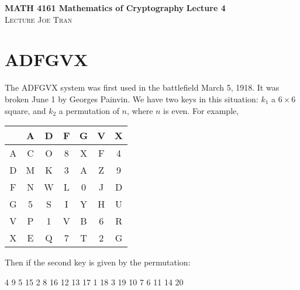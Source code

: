 \documentclass[11pt]{article}
\theoremstyle{definition}\newtheorem{definition}{Definition}
\theoremstyle{definition}\newtheorem{example}{Example}
\theoremstyle{definition}\newtheorem{samplecode}{Sample Code}
\begin{document}
\noindent \textbf{MATH 4161 Mathematics of Cryptography} \hfill \textbf{Lecture 4} \\
\noindent \textsc{Lecture} \hfill \textsc{Joe Tran}

\section{ADFGVX}

The ADFGVX system was first used in the battlefield March 5, 1918. It was broken June 1 by Georges Painvin. We have two keys in this situation: $k_1$ a $6 \times 6$ square, and $k_2$ a permutation of $n$, where $n$ is even. For example,
\begin{center}
    \begin{tabular}{c|cccccc}
        & A & D & F & G & V & X \\ \hline
        A & C & O & 8 & X & F & 4 \\
        D & M & K & 3 & A & Z & 9 \\
        F & N & W & L & 0 & J & D \\
        G & 5 & S & I & Y & H & U \\
        V & P & 1 & V & B & 6 & R \\
        X & E & Q & 7 & T & 2 & G \\
    \end{tabular}
\end{center}

Then if the second key is given by the permutation:
\begin{center}
    4 9 5 15 2 8 16 12 13 17 1 18 3 19 10 7 6 11 14 20
\end{center}
\end{document}
